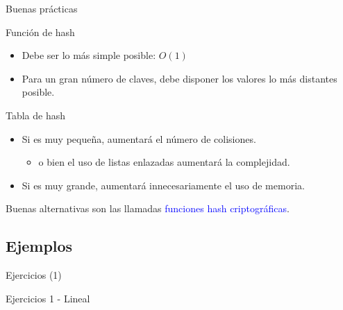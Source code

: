 \documentclass[handout]{beamer} %
\newcommand{\blue}[1]{\textcolor{blue}{#1}}
\begin{document}
\begin{frame}{Buenas prácticas}
    \begin{block}{Función de hash}
    \begin{itemize}
        \item Debe ser lo más simple posible: $O(1)$
        \item Para un gran número de claves, debe disponer los valores lo más distantes posible.
    \end{itemize}
    \end{block}
    \pause
    \begin{block}{Tabla de hash}
    \begin{itemize}
        \item Si es muy pequeña, aumentará el número de colisiones.
        \begin{itemize}
            \item o bien el uso de listas enlazadas aumentará la complejidad.
        \end{itemize}
        \item Si es muy grande, aumentará innecesariamente el uso de memoria.
    \end{itemize}
    \end{block}
    \pause
    Buenas alternativas son las llamadas \blue{funciones hash criptográficas}.
\end{frame}


\subsection{Ejemplos} {Ejercicios (1)}
\begin{frame}{Ejercicios 1 - Lineal}
\end{frame}
\end{document}
